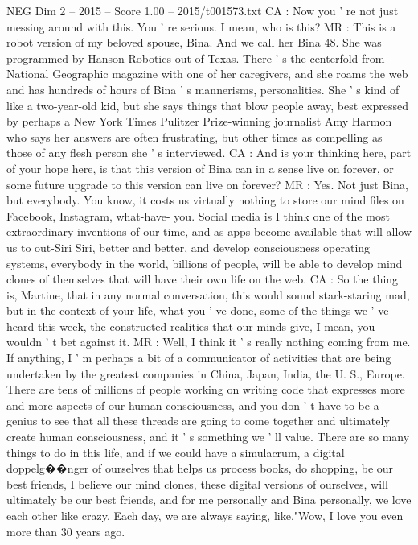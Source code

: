 \begin{textsample}{NEG Dim 2 – 2015 – Score 1.00 – 2015/t001573.txt}
CA : Now you ' re not just messing around with this.
You ' re serious.
I mean, who is this?
MR : This is a robot version of my beloved spouse, Bina.
And we call her Bina 48.
She was programmed by Hanson Robotics out of Texas.
There ' s the centerfold from National Geographic magazine with one of her caregivers, and she roams the web and has hundreds of hours of Bina ' s mannerisms, personalities.
She ' s kind of like a two-year-old kid, but she says things that blow people away, best expressed by perhaps a New York Times Pulitzer Prize-winning journalist Amy Harmon who says her answers are often frustrating, but other times as compelling as those of any flesh person she ' s interviewed.
CA : And is your thinking here, part of your hope here, is that this version of Bina can in a sense live on forever, or some future upgrade to this version can live on forever?
MR : Yes.
Not just Bina, but everybody.
You know, it costs us virtually nothing to store our mind files on Facebook, Instagram, what-have- you.
Social media is I think one of the most extraordinary inventions of our time, and as apps become available that will allow us to out-Siri Siri, better and better, and develop consciousness operating systems, everybody in the world, billions of people, will be able to develop mind clones of themselves that will have their own life on the web.
CA : So the thing is, Martine, that in any normal conversation, this would sound stark-staring mad, but in the context of your life, what you ' ve done, some of the things we ' ve heard this week, the constructed realities that our minds give, I mean, you wouldn ' t bet against it.
MR : Well, I think it ' s really nothing coming from me.
If anything, I ' m perhaps a bit of a communicator of activities that are being undertaken by the greatest companies in China, Japan, India, the U.
S., Europe.
There are tens of millions of people working on writing code that expresses more and more aspects of our human consciousness, and you don ' t have to be a genius to see that all these threads are going to come together and ultimately create human consciousness, and it ' s something we ' ll value.
There are so many things to do in this life, and if we could have a simulacrum, a digital doppelg{\EmojiFont �}{\EmojiFont �}nger of ourselves that helps us process books, do shopping, be our best friends, I believe our mind clones, these digital versions of ourselves, will ultimately be our best friends, and for me personally and Bina personally, we love each other like crazy.
Each day, we are always saying, like,"Wow, I love you even more than 30 years ago.

\end{textsample}
